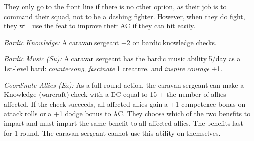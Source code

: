 They only go to the front line if there is no other option, as their job is to command their squad, not to be a dashing fighter. However, when they do fight, they will use the  feat to improve their AC if they can hit easily.

\textit{Bardic Knowledge:} A caravan sergeant +2 on bardic knowledge checks.

\textit{Bardic Music (Su):} A caravan sergeant has the bardic music ability 5/day as a 1st-level bard: \emph{countersong}, \emph{fascinate} 1 creature, and \emph{inspire courage} +1.

\textit{Coordinate Allies (Ex):} As a full-round action, the caravan sergeant can make a Knowledge (warcraft) check with a DC equal to 15 + the number of allies affected. If the check succeeds, all affected allies gain a +1 competence bonus on attack rolls or a +1 dodge bonus to AC. They choose which of the two benefits to impart and must impart the same benefit to all affected allies. The benefits last for 1 round. The caravan sergeant cannot use this ability on themselves.

